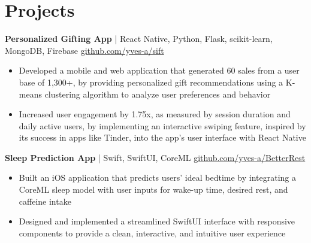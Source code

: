 

\section*{Projects}
\textbf{Personalized Gifting App} | React Native, Python, Flask, scikit-learn, MongoDB, Firebase \hfill \href{https://github.com/yves-a/sift}{github.com/yves-a/sift} \\
\vspace{-5pt}
\begin{itemize}
  \item Developed a mobile and web application that generated 60 sales from a user base of 1,300+, by providing personalized gift recommendations using a K-means clustering algorithm to analyze user preferences and behavior
  \item Increased user engagement by 1.75x, as measured by session duration and daily active users, by implementing an interactive swiping feature, inspired by its success in apps like Tinder, into the app's user interface with React Native
\end{itemize}

\textbf{Sleep Prediction App} | Swift, SwiftUI, CoreML \hfill \href{https://github.com/yves-a/BetterRest}{github.com/yves-a/BetterRest} \\
\vspace{-5pt}
\begin{itemize}
  \item Built an iOS application that predicts users’ ideal bedtime by integrating a CoreML sleep model with user inputs for wake-up time, desired rest, and caffeine intake
  \item Designed and implemented a streamlined SwiftUI interface with responsive components to provide a clean, interactive, and intuitive user experience
\end{itemize}



